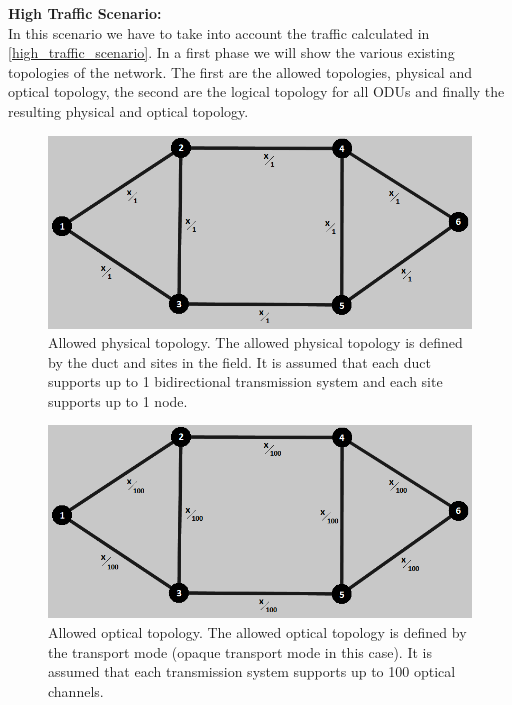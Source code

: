 \textbf{High Traffic Scenario:}\\

In this scenario we have to take into account the traffic calculated in \ref{high_traffic_scenario}. In a first phase we will show the various existing topologies of the network. The first are the allowed topologies, physical and optical topology, the second are the logical topology for all ODUs and finally the resulting physical and optical topology.\\

\begin{figure}[H]
\centering
\includegraphics[width=13cm]{sdf/heuristic/opaque_protection/high/allowed_physical_high}
\caption{Allowed physical topology. The allowed physical topology is defined by the duct and sites in the field. It is assumed that each duct supports up to 1 bidirectional transmission system and each site supports up to 1 node.}
\label{allowed_physical_protec_ref_high_heuristic}
\end{figure}

\begin{figure}[H]
\centering
\includegraphics[width=13cm]{sdf/heuristic/opaque_protection/high/allowed_optical_high}
\caption{Allowed optical topology. The allowed optical topology is defined by the transport mode (opaque transport mode in this case). It is assumed that each transmission system supports up to 100 optical channels.}
\label{allowed_optical_protec_ref_high_heuristic}
\end{figure}

